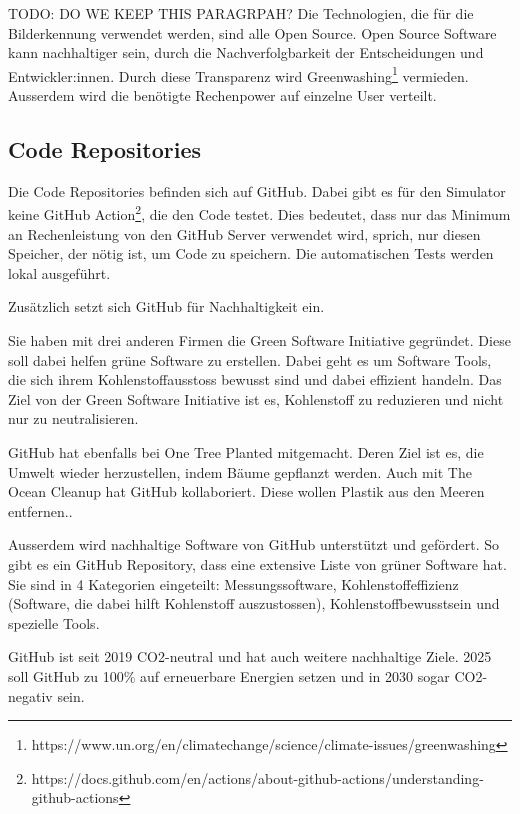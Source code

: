 TODO: DO WE KEEP THIS PARAGRPAH? Die Technologien, die für die Bilderkennung verwendet werden, sind alle Open Source. Open Source Software kann nachhaltiger sein, durch die Nachverfolgbarkeit der Entscheidungen und Entwickler:innen. Durch diese Transparenz wird Greenwashing\footnote{https://www.un.org/en/climatechange/science/climate-issues/greenwashing} vermieden. Ausserdem wird die benötigte Rechenpower auf einzelne User verteilt\cite{oss-sustainability}.

\subsection{Code Repositories}

Die Code Repositories befinden sich auf GitHub. Dabei gibt es für den Simulator keine GitHub Action\footnote{https://docs.github.com/en/actions/about-github-actions/understanding-github-actions}, die den Code testet. Dies bedeutet, dass nur das Minimum an Rechenleistung von den GitHub Server verwendet wird, sprich, nur diesen Speicher, der nötig ist, um Code zu speichern. Die automatischen Tests werden lokal ausgeführt.

Zusätzlich setzt sich GitHub für Nachhaltigkeit ein.\cite{github-sustainability}

Sie haben mit drei anderen Firmen die Green Software Initiative gegründet. Diese soll dabei helfen grüne Software zu erstellen.  Dabei geht es um Software Tools, die sich ihrem Kohlenstoffausstoss bewusst sind und dabei effizient handeln. Das Ziel von der Green Software Initiative ist es, Kohlenstoff zu reduzieren und nicht nur zu neutralisieren.\cite{green-software-initiative}

GitHub hat ebenfalls bei One Tree Planted mitgemacht. Deren Ziel ist es, die Umwelt wieder herzustellen, indem Bäume gepflanzt werden\cite{one-tree-planted}. Auch mit The Ocean Cleanup hat GitHub kollaboriert. Diese wollen Plastik aus den Meeren entfernen.\cite{ocean-cleanup}.

Ausserdem wird nachhaltige Software von GitHub unterstützt und gefördert. So gibt es ein GitHub Repository, dass eine extensive Liste von grüner Software hat. Sie sind in 4 Kategorien eingeteilt: Messungssoftware, Kohlenstoffeffizienz (Software, die dabei hilft Kohlenstoff auszustossen), Kohlenstoffbewusstsein und spezielle Tools. \cite{green-software}

GitHub ist seit 2019 CO2-neutral und hat auch weitere nachhaltige Ziele. 2025 soll GitHub zu 100\% auf erneuerbare Energien setzen und in 2030 sogar CO2-negativ sein.\cite{github-goals}





